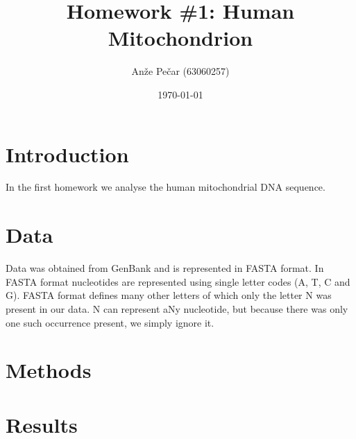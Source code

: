 \documentclass[a4paper,11pt]{article}
\title{Homework \#1: Human Mitochondrion}
\author{Anže Pečar (63060257)}
\date{\today}
\begin{document}
\maketitle

\section{Introduction}

In the first homework we analyse the human mitochondrial DNA sequence.   

\section{Data}

Data was obtained from GenBank and is represented in FASTA format. In FASTA format nucleotides are represented using single letter codes (A, T, C and G). FASTA format defines many other letters of which only the letter N was present in our data. N can represent aNy nucleotide, but because there was only one such occurrence present, we simply ignore it. 

\section{Methods}





\section{Results}

\end{document}

